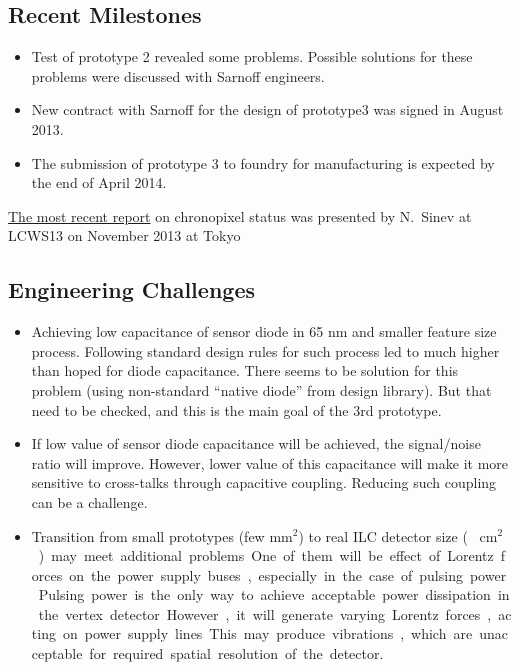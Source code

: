\subsection{Recent Milestones}
\begin{itemize}
    \item Test of prototype 2 revealed some problems. Possible solutions for these problems were discussed with Sarnoff engineers.  
    \item New contract with Sarnoff for the design of prototype3 was signed in August 2013.
    \item The submission of prototype 3 to foundry for manufacturing is expected by the end of April 2014.
\end{itemize}
\href{https://agenda.linearcollider.org/getFile.py/access?contribId=309&sessionId=37&resId=1&materialId=slides&confId=6000}{The most recent report} on chronopixel status was presented by N.~Sinev at LCWS13 on November 2013 at Tokyo 

\subsection{Engineering Challenges}
\begin{itemize}
    \item Achieving low capacitance of sensor diode in 65 nm and smaller feature size process. Following standard design rules for such process led to much higher than hoped for diode capacitance. There seems to be solution for this problem (using non-standard “native diode” from design library). But that need to be checked, and this is the main goal of the 3rd prototype. 
    \item If low value of sensor diode capacitance will be achieved, the signal/noise ratio will improve. However, lower value of this capacitance will make it more sensitive to cross-talks through capacitive coupling. Reducing such coupling can be a challenge.
    \item Transition from small prototypes (few $\text{mm}^{2}$) to real ILC detector size (~ \unit[10]{$\text{cm}^2$}) may meet additional problems. One of them will be effect of Lorentz forces on the power supply buses, especially in the case of pulsing power. Pulsing power is the only way to achieve acceptable power dissipation in the vertex detector. However, it will generate varying Lorentz forces, acting on power supply lines. This may produce vibrations, which are unacceptable for required spatial resolution of the detector.
\end{itemize}

